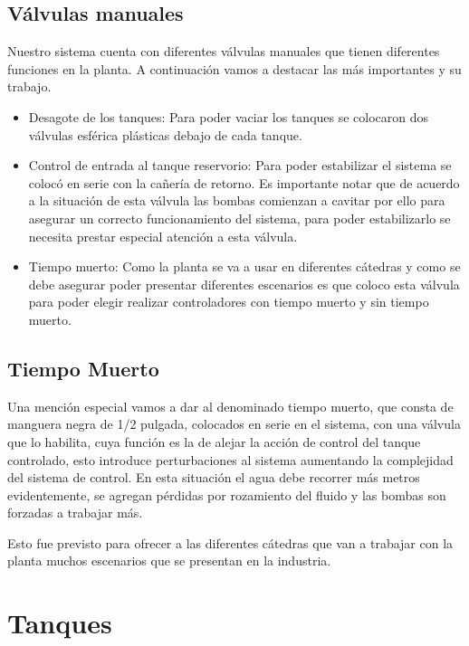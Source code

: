 \subsection{Válvulas manuales}

Nuestro sistema cuenta con diferentes válvulas manuales que tienen diferentes funciones en la planta.
A continuación vamos a destacar las más importantes y su trabajo.

\begin{itemize}
  \item Desagote de los tanques:
  Para poder vaciar los tanques se colocaron dos válvulas esférica plásticas debajo de cada tanque.
  \item Control de entrada al tanque reservorio:
  Para poder estabilizar el sistema se colocó en serie con la cañería de retorno.
  Es importante notar que de acuerdo a la situación de esta válvula las bombas comienzan a cavitar 
  por ello para asegurar un correcto funcionamiento del sistema, para poder estabilizarlo se necesita
  prestar especial atención a esta válvula.
  \item Tiempo muerto: 
  Como la planta se va a usar en diferentes cátedras y como se debe asegurar poder presentar diferentes
  escenarios es que coloco esta válvula para poder elegir realizar controladores con tiempo muerto
  y sin tiempo muerto.
 \end{itemize}

\subsection{Tiempo Muerto}
Una mención especial vamos a dar al denominado tiempo muerto, que consta de  manguera negra de 1/2 pulgada, colocados en serie en el sistema, con una válvula que lo
habilita, cuya función es la de alejar la acción de control del tanque  controlado, esto introduce 
perturbaciones al sistema aumentando la complejidad del sistema de control. En esta situación el agua
debe recorrer más metros evidentemente, se agregan pérdidas por rozamiento del fluido y las bombas 
son forzadas a trabajar más.

Esto fue previsto para ofrecer a las diferentes cátedras que van a trabajar con la planta muchos 
escenarios que se presentan en la industria.

\section{Tanques}
\label{sec:Tanques}

